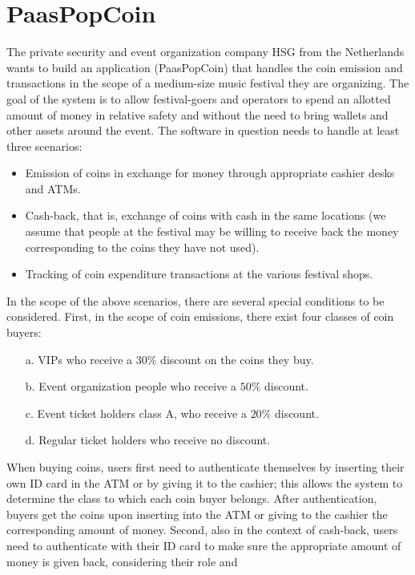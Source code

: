 \documentclass[12pt, a4paper]{report}
\newtheorem[style=M,bodystyle=\normalfont]{theorem}{Theorem}
\newtheorem[style=M,bodystyle=\normalfont]{corollary}{Corollary}
\newtheorem[style=M,bodystyle=\normalfont]{lemma}{Lemma}
\newtheorem[style=M,bodystyle=\normalfont]{definition}{Definition}
\begin{document}
    \section{PaasPopCoin}
        The private security and event organization company HSG from the Netherlands wants to build an application (PaasPopCoin) that handles the coin emission and transactions in 
        the scope of a medium-size music festival they are organizing. The goal of the system is to allow festival-goers and operators to spend an allotted amount of money in 
        relative safety and without the need to bring wallets and other assets around the event. The software in question needs to handle at least three scenarios:
        \begin{itemize}
            \item Emission of coins in exchange for money through appropriate cashier desks and ATMs.
            \item Cash-back, that is, exchange of coins with cash in the same locations (we assume that people at the festival may be willing to receive back the money corresponding
                to the coins they have not used).
            \item Tracking of coin expenditure transactions at the various festival shops.
        \end{itemize}
        In the scope of the above scenarios, there are several special conditions to be considered. First, in the scope of coin emissions, there exist four classes of coin buyers: 
        \begin{itemize}
            \item [a.] VIPs who receive a $30\%$ discount on the coins they buy. 
            \item [b.] Event organization people who receive a $50\%$ discount. 
            \item [c.] Event ticket holders class A, who receive a $20\%$ discount. 
            \item [d.] Regular ticket holders who receive no discount.
        \end{itemize}
        When buying coins, users first need to authenticate themselves by inserting their own ID card in the ATM or by giving it to the cashier; this allows the system to determine 
        the class to which each coin buyer belongs. After authentication, buyers get the coins upon inserting into the ATM or giving to the cashier the corresponding amount of money.
        Second, also in the context of cash-back, users need to authenticate with their ID card to make sure the appropriate amount of money is given back, considering their role and 
\end{document}
